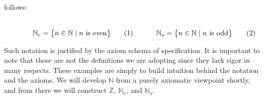         follows:
        \par
        \begin{subequations}
            \begin{minipage}[b]{0.495\textwidth}
                \centering
                \begin{equation}
                    \label{eqn:Even_Pos_Ints_Set_Builder}%
                    \mathbb{N}_{e}=
                    \big\{n\in\mathbb{N}\;|\;n\textrm{ is even}\big\}
                \end{equation}
            \end{minipage}
            \hfill
            \begin{minipage}[b]{0.495\textwidth}
                \centering
                \begin{equation}
                    \label{eqn:Odd_Pos_Ints_Set_Builder}%
                    \mathbb{N}_{o}=
                    \big\{n\in\mathbb{N}\;|\;n\textrm{ is odd}\big\}
                \end{equation}
            \end{minipage}
        \end{subequations}
        \par\vspace{2.5ex}
        Such notation is justified by the axiom schema of specification. It is
        important to note that these are not the definitions we are adopting
        since they lack rigor in many respects. These examples are simply to
        build intuition behind the notation and the axioms. We will develop
        $\mathbb{N}$ from a purely axiomatic viewpoint shortly, and from there
        we will construct $\mathbb{Z}$, $\mathbb{N}_{e}$, and
        $\mathbb{N}_{o}$.
